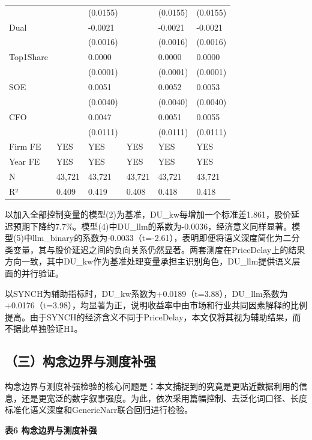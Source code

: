 {\begin{longtable}[]{@{}llllll@{}}
& & (0.0155) & & (0.0155) & (0.0155) \\
Dual & & -0.0021 & & -0.0021 & -0.0021 \\
& & (0.0016) & & (0.0016) & (0.0016) \\
Top1Share & & 0.0000 & & 0.0000 & 0.0000 \\
& & (0.0001) & & (0.0001) & (0.0001) \\
SOE & & 0.0051 & & 0.0052 & 0.0053 \\
& & (0.0040) & & (0.0040) & (0.0040) \\
CFO & & 0.0047 & & 0.0051 & 0.0055 \\
& & (0.0111) & & (0.0111) & (0.0111) \\
Firm FE & YES & YES & YES & YES & YES \\
Year FE & YES & YES & YES & YES & YES \\
N & 43,721 & 43,721 & 43,721 & 43,721 & 43,721 \\
R² & 0.409 & 0.419 & 0.408 & 0.418 & 0.418 \\
\end{longtable}
}

以加入全部控制变量的模型(2)为基准，DU\_kw每增加一个标准差1.861，股价延迟预期下降约7.7\%。模型(4)中DU\_llm的系数为-0.0036，经济意义同样显著。模型(5)中llm\_binary的系数为-0.0033（t=-2.61），表明即便将语义深度简化为二分类变量，其与股价延迟之间的负向关系仍然显著。两套测度在PriceDelay上的结果方向一致，其中DU\_kw作为基准处理变量承担主识别角色，DU\_llm提供语义层面的并行验证。

以SYNCH为辅助指标时，DU\_kw系数为+0.0189（t=3.88），DU\_llm系数为+0.0176（t=3.98），均显著为正，说明收益率中由市场和行业共同因素解释的比例提高。由于SYNCH的经济含义不同于PriceDelay，本文仅将其视为辅助结果，而不据此单独验证H1。

\subsection{（三）构念边界与测度补强}\label{ux4e09ux6784ux5ff5ux8fb9ux754cux4e0eux6d4bux5ea6ux8865ux5f3a}

构念边界与测度补强检验的核心问题是：本文捕捉到的究竟是更贴近数据利用的信息，还是更宽泛的数字叙事强度。为此，依次采用篇幅控制、去泛化词口径、长度标准化语义深度和GenericNarr联合回归进行检验。

\textbf{表6 构念边界与测度补强}

